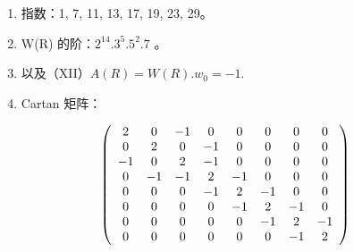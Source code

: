 \begin{enumerate}
\def\labelenumi{(\Roman{enumi})}
\setcounter{enumi}{8}
\item
  指数：1, 7, 11, 13, 17, 19, 23, 29。
\item
  W(R) 的阶：\(2^{14}.3^{5}.5^{2}.7\) 。
\item
  以及（XII）\(A(R) = W(R). w_0 = -1.\)
\item
  Cartan 矩阵：
\end{enumerate}

\[
\left( \begin{array}{c c c c c c c c} 2 & 0 & - 1 & 0 & 0 & 0 & 0 & 0 \\ 0 & 2 & 0 & - 1 & 0 & 0 & 0 & 0 \\ - 1 & 0 & 2 & - 1 & 0 & 0 & 0 & 0 \\ 0 & - 1 & - 1 & 2 & - 1 & 0 & 0 & 0 \\ 0 & 0 & 0 & - 1 & 2 & - 1 & 0 & 0 \\ 0 & 0 & 0 & 0 & - 1 & 2 & - 1 & 0 \\ 0 & 0 & 0 & 0 & 0 & - 1 & 2 & - 1 \\ 0 & 0 & 0 & 0 & 0 & 0 & - 1 & 2 \end{array} \right)
\]

